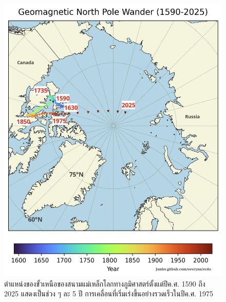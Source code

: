 \documentclass[10pt,twocolumn,letterpaper]{article}
\begin{document}
\begin{figure}[t]
\begin{center}
   \includegraphics[width=1\linewidth]{npw.jpg}
\end{center}
   \caption{ตำแหน่งของขั้วเหนือของสนามแม่เหล็กโลกทางภูมิศาสตร์ตั้งแต่ปีค.ศ. 1590 ถึง 2025 แสดงเป็นช่วง ๆ ละ 5 ปี \cite{41} การเคลื่อนที่เริ่มเร่งขึ้นอย่างรวดเร็วในปีค.ศ. 1975}
\label{fig:13}
\label{fig:onecol}
\end{figure}
\end{document}
